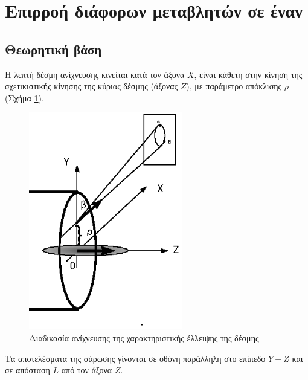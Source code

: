 \section{Επιρροή διάφορων μεταβλητών σε έναν }
\subsection{Θεωρητική βάση}
Η λεπτή δέσμη ανίχνευσης κινείται κατά τον άξονα $X$, είναι κάθετη στην κίνηση της σχετικιστικής κίνησης της κύριας δέσμης (άξονας $Z$), με παράμετρο απόκλισης $\rho$ (Σχήμα \ref{fig:ellipse-EBS}).

\begin{figure}[tph]
	\includegraphics[width=0.6\textwidth]{figures/Logatchov1999-EBS}
	\centering
	\caption{Διαδικασία ανίχνευσης της χαρακτηριστικής έλλειψης της δέσμης}
	\label{fig:ellipse-EBS}
\end{figure}

Τα αποτελέσματα της σάρωσης γίνονται  σε οθόνη παράλληλη στο επίπεδο $Y-Z$ και σε απόσταση $L$ από τον άξονα $Z$.

